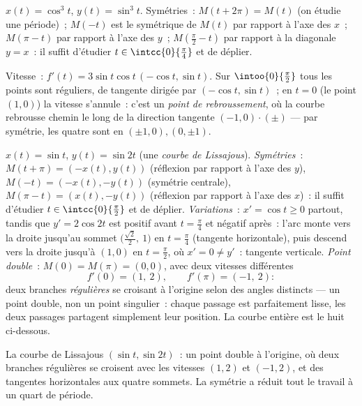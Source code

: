 \begin{example}[L'astroïde]\label{ex:b1:curves:astroid}
$x(t) = \cos^3 t$, $y(t) = \sin^3 t$. Symétries~:
$M(t + 2\pi) = M(t)$ (on étudie une période)~; $M(-t)$ est le
symétrique de $M(t)$ par rapport à l'axe des $x$~; $M(\pi - t)$ par
rapport à l'axe des $y$~; $M(\frac\pi2 - t)$ par rapport à la
diagonale $y = x$~: il suffit d'étudier $t \in
\intcc{0}{\frac\pi4}$ et de déplier.

Vitesse~: $f'(t) = 3\sin t\cos t\,(-\cos t, \sin t)$. Sur
$\intoo{0}{\frac\pi2}$ tous les points sont réguliers, de tangente
dirigée par $(-\cos t, \sin t)$~; en $t = 0$ (le point $(1,0)$) la
vitesse s'annule~: c'est un \emph{point de
rebroussement}, où la courbe rebrousse
chemin le long de la direction tangente $(-1, 0)\cdot(\pm)$ --- par
symétrie, les quatre  sont en $(\pm1, 0), (0, \pm1)$.
\end{example}

\begin{example}
\label{ex:b1:curves:lissajous}
$x(t) = \sin t$, $y(t) = \sin 2t$ (une \emph{courbe de Lissajous}).
\emph{Symétries}~: $M(t + \pi) = (-x(t), y(t))$ (réflexion par
rapport à l'axe des $y$), $M(-t) = (-x(t), -y(t))$ (symétrie
centrale), $M(\pi - t) = (x(t), -y(t))$ (réflexion par rapport à
l'axe des $x$)~: il suffit d'étudier $t \in \intcc{0}{\frac\pi2}$
et de déplier.
\emph{Variations}~: $x' = \cos t \geq 0$ partout, tandis que $y' =
2\cos 2t$ est positif avant $t = \frac\pi4$ et négatif après~:
l'arc monte vers la droite jusqu'au sommet
$\bigl(\frac{\sqrt2}2,\ 1\bigr)$ en $t = \frac\pi4$ (tangente
horizontale), puis descend vers la droite jusqu'à $(1, 0)$ en $t =
\frac\pi2$, où $x' = 0 \neq y'$~: tangente verticale.
\emph{Point double}~: $M(0) = M(\pi) = (0,0)$, avec deux vitesses
différentes
\[
f'(0) = (1,\ 2), \qquad f'(\pi) = (-1,\ 2) :
\]
deux branches \emph{régulières} se croisant à l'origine selon des
angles distincts --- un point double, non un point singulier~: chaque
passage est parfaitement lisse, les deux passages partagent
simplement leur position. La courbe entière est le huit ci-dessous.
\end{example}

\begin{omfigure}

{\small La courbe de Lissajous $(\sin t, \sin 2t)$~: un point double
à l'origine, où deux branches régulières se croisent avec les
vitesses $(1, 2)$ et $(-1, 2)$, et des tangentes horizontales aux
quatre sommets. La symétrie a réduit tout le travail à un quart de période.}
\end{omfigure}

